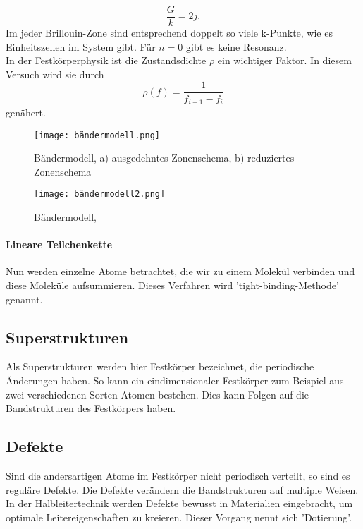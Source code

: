 \begin{equation*}
  \frac{G}{k} = 2 j.
\end{equation*}
Im jeder Brillouin-Zone sind entsprechend doppelt so viele k-Punkte, wie es Einheitszellen im System gibt.
Für $n=0$ gibt es keine Resonanz.\\
In der Festkörperphysik ist die Zustandsdichte $\rho$ ein wichtiger Faktor.
In diesem Versuch wird sie durch
\begin{equation}
  \rho(f) = \frac{1}{f_{i+1}-f_{i}}
  \label{eqn:zustandsdichte}
\end{equation}
genähert.
\begin{figure}[h!]
  \centering
  \texttt{[image: bändermodell.png]}
  \caption{Bändermodell, a) ausgedehntes Zonenschema, b) reduziertes Zonenschema \cite{bändermodell}}
  \label{fig:bändermodell}
\end{figure}
\begin{figure}[h!]
  \centering
  \texttt{[image: bändermodell2.png]}
  \caption{Bändermodell, \cite{bändermodell2}}
  \label{fig:bändermodell2}
\end{figure}
\FloatBarrier
%
\paragraph{Lineare Teilchenkette}
Nun werden einzelne Atome betrachtet, die wir zu einem Molekül verbinden und diese Moleküle aufsummieren.
Dieses Verfahren wird 'tight-binding-Methode' genannt.
%
\subsection{Superstrukturen}
Als Superstrukturen werden hier Festkörper bezeichnet, die periodische Änderungen haben.
So kann ein eindimensionaler Festkörper zum Beispiel aus zwei verschiedenen Sorten Atomen bestehen.
Dies kann Folgen auf die Bandstrukturen des Festkörpers haben.
%
\subsection{Defekte}
Sind die andersartigen Atome im Festkörper nicht periodisch verteilt, so sind es reguläre Defekte.
Die Defekte verändern die Bandstrukturen auf multiple Weisen.
In der Halbleitertechnik werden Defekte bewusst in Materialien eingebracht, um optimale Leitereigenschaften zu kreieren.
Dieser Vorgang nennt sich 'Dotierung'.
%
